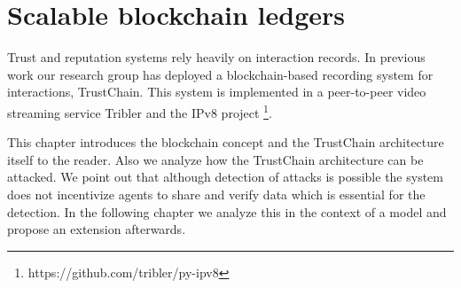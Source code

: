 \chapter{Scalable blockchain ledgers}
\label{chap:implementation}

Trust and reputation systems rely heavily on interaction records. In previous work our 
research group has deployed a blockchain-based recording system for interactions, TrustChain. This system is 
implemented in a peer-to-peer video streaming service Tribler and the IPv8 project
\footnote{https://github.com/tribler/py-ipv8}. 

This chapter introduces the blockchain concept and the TrustChain architecture itself to the reader. 
Also we analyze how the TrustChain architecture can be attacked. We point
out that although detection of attacks is possible the system does not incentivize agents to share 
and verify data which is essential for the detection. In the following chapter we analyze this in the
context of a model and propose an extension afterwards. 







